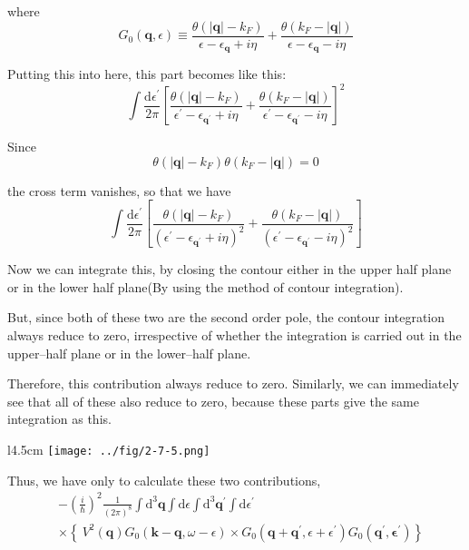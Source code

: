 where
\[ G_0(\mathbf{q},\epsilon) \equiv \frac{\theta(|\mathbf{q}|-k_F)}{\epsilon - \epsilon_{\mathbf{q}}+i \eta} + \frac{\theta(k_F-|\mathbf{q}|)}{\epsilon - \epsilon_{\mathbf{q}}-i \eta} \]

Putting this into here, this part becomes like this:
\[ \int \frac{\mathrm{d}\epsilon^{'}}{2\pi} \left[ \frac{\theta(|\mathbf{q}|-k_F)}{\epsilon^{'} - \epsilon_{\mathbf{q}^{'}}+i \eta} + \frac{\theta(k_F-|\mathbf{q}|)}{\epsilon^{'} - \epsilon_{\mathbf{q}^{'}}-i \eta} \right]^2 \]

Since $$\theta(|\mathbf{q}|-k_F)\theta(k_F-|\mathbf{q}|) = 0$$

 the cross term vanishes, so that we have
\[ \int \frac{\mathrm{d}\epsilon^{'}}{2\pi} \left[ \frac{\theta(|\mathbf{q}|-k_F)}{\left(\epsilon^{'} - \epsilon_{\mathbf{q}^{'}}+i \eta\right)^2} + \frac{\theta(k_F-|\mathbf{q}|)}{\left(\epsilon^{'} - \epsilon_{\mathbf{q}^{'}}-i \eta\right)^2} \right] \]

Now we can integrate this, by closing the contour either in the upper half plane or in the lower half plane(By using the method of contour integration).

But, since both of these two are the second order pole, the contour integration always reduce to zero, irrespective of whether the integration is carried out in the upper--half plane or in the lower--half plane.

Therefore, this contribution always reduce to zero. Similarly, we can immediately see that all of these also reduce to zero, because these parts give the same integration as this.

\begin{wrapfigure}[8]{l}{4.5cm}
\label{Fig2.7.5} \texttt{[image: ../fig/2-7-5.png]}
\end{wrapfigure}
Thus, we have only to calculate these two contributions,
\[ \begin{split} &- \left( \frac{i}{\hbar}\right)^2 \frac{1}{\left( 2\pi \right)^8} \int \mathrm{d}^3 \mathbf{q} \int \mathrm{d}\epsilon \int \mathrm{d}^3 \mathbf{q}^{'} \int \mathrm{d} \epsilon^{'} \\
&\times \left\{ \ V^2(\mathbf{q})G_0(\mathbf{k}-\mathbf{q},\omega-\epsilon) \times G_0(\mathbf{q} + \mathbf{q}^{'}, \epsilon + \epsilon^{'}) G_0(\mathbf{q}^{'},\mathbf{\epsilon}^{'}) \right\} \end{split} \]


